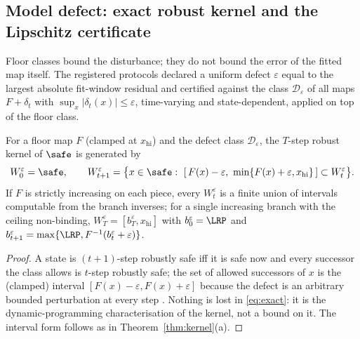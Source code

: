 \subsection{Model defect: exact robust kernel and the Lipschitz certificate}\label{sec:defect}

Floor classes bound the disturbance; they do not bound the error of the fitted map itself. The registered protocols declared a uniform defect $\varepsilon$ equal to the largest absolute fit-window residual and certified against the class $\mathcal D_\varepsilon$ of all maps $F+\delta_t$ with $\sup_x|\delta_t(x)|\le\varepsilon$, time-varying and state-dependent, applied on top of the floor class.

\begin{theorem}\label{thm:exact}
For a floor map $F$ (clamped at $x_{\mathrm{hi}}$) and the defect class $\mathcal D_\varepsilon$, the $T$-step robust kernel of $\safe$ is generated by
\begin{equation}\label{eq:exact}
W^{\varepsilon}_0=\safe,\qquad W^{\varepsilon}_{t+1}=\bigl\{x\in\safe:\ [\,F(x)-\varepsilon,\ \min\{F(x)+\varepsilon,x_{\mathrm{hi}}\}\,]\subset W^{\varepsilon}_t\bigr\}.
\end{equation}
If $F$ is strictly increasing on each piece, every $W^{\varepsilon}_t$ is a finite union of intervals computable from the branch inverses; for a single increasing branch with the ceiling non-binding, $W^{\varepsilon}_T=[b^{\varepsilon}_T,x_{\mathrm{hi}}]$ with $b^{\varepsilon}_0=\LRP$ and $b^{\varepsilon}_{t+1}=\max\{\LRP,F^{-1}(b^{\varepsilon}_t+\varepsilon)\}$.
\end{theorem}
\begin{proof}
A state is $(t{+}1)$-step robustly safe iff it is safe now and every successor the class allows is $t$-step robustly safe; the set of allowed successors of $x$ is the (clamped) interval $[F(x)-\varepsilon,F(x)+\varepsilon]$ because the defect is an arbitrary bounded perturbation at every step \cite{BertsekasRhodes1971,Aubin1991}. Nothing is lost in \eqref{eq:exact}: it is the dynamic-programming characterisation of the kernel, not a bound on it. The interval form follows as in Theorem~\ref{thm:kernel}(a).
\end{proof}

